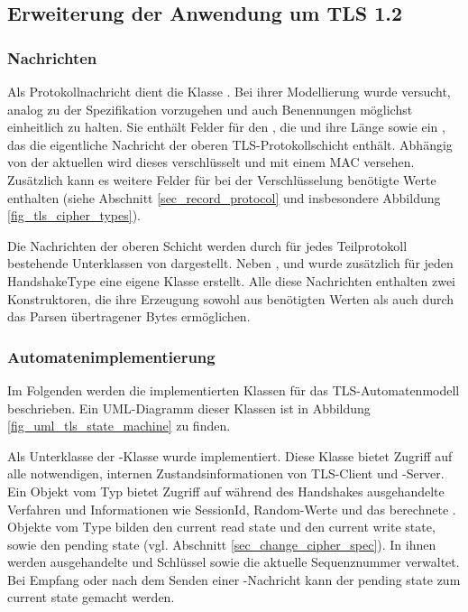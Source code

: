 \subsection{Erweiterung der Anwendung um TLS 1.2}


\subsubsection{Nachrichten}
Als Protokollnachricht dient die Klasse . Bei ihrer Modellierung wurde versucht, analog zu der Spezifikation vorzugehen und auch Benennungen möglichst einheitlich zu halten. Sie enthält Felder für den , die  und ihre Länge sowie ein , das die eigentliche Nachricht der oberen TLS-Protokollschicht enthält.
Abhängig von der aktuellen \ciphersuite{} wird dieses  verschlüsselt und mit einem MAC versehen. Zusätzlich kann es weitere Felder für bei der Verschlüsselung benötigte Werte enthalten (siehe Abschnitt \ref{sec_record_protocol} und insbesondere Abbildung \ref{fig_tls_cipher_types}). 

Die Nachrichten der oberen Schicht werden durch für jedes Teilprotokoll bestehende Unterklassen von  dargestellt. Neben ,  und  wurde zusätzlich für jeden HandshakeType eine eigene Klasse erstellt. Alle diese Nachrichten enthalten zwei Konstruktoren, die ihre Erzeugung sowohl aus benötigten Werten als auch durch das Parsen übertragener Bytes ermöglichen. 

\subsubsection{Automatenimplementierung}
Im Folgenden werden die implementierten Klassen für das TLS-Automatenmodell beschrieben. Ein UML-Diagramm dieser Klassen ist in Abbildung \ref{fig_uml_tls_state_machine} zu finden.

Als Unterklasse der -Klasse wurde  implementiert. Diese Klasse bietet Zugriff auf alle notwendigen, internen Zustandsinformationen von TLS-Client und -Server. Ein Objekt vom Typ  bietet Zugriff auf während des Handshakes ausgehandelte Verfahren und Informationen wie SessionId, Random-Werte und das berechnete \mastersecret{}. Objekte vom Type  bilden den current read state und den current write state, sowie den pending state (vgl. Abschnitt \ref{sec_change_cipher_spec}). In ihnen werden ausgehandelte \ciphersuite{} und Schlüssel sowie die aktuelle Sequenznummer verwaltet. Bei Empfang oder nach dem Senden einer \changecipherspec{}-Nachricht kann der pending state zum current state gemacht werden.

